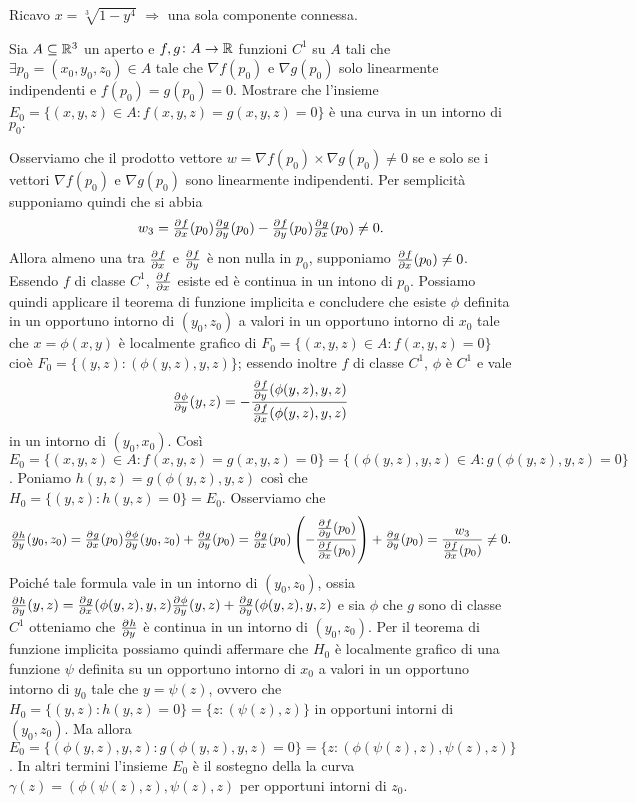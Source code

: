 Ricavo $ x = \sqrt[3]{1 - y^4} $ $ \Rightarrow $ una sola componente connessa.

\begin{es}
  Sia $ A \subseteq \mathbb{R}^3 $ un aperto e $ f, g \colon A \to \mathbb{R} $ funzioni $ C^1 $ su $ A $ tali che $ \exists p_0 = (x_0, y_0, z_0) \in A $ tale che $ \nabla{f(p_0)} $ e $ \nabla{g(p_0)} $ solo linearmente indipendenti e $ f(p_0) = g(p_0) = 0 $. Mostrare che l'insieme $ E_0 = \{(x, y, z) \in A : f(x, y, z) = g(x, y, z) = 0\} $ è una curva in un intorno di $ p_0 .$
\end{es}
%
Osserviamo che il prodotto vettore $ w = \nabla{f(p_0)} \times \nabla{g(p_0)} \neq 0 $ se e solo se i vettori $ \nabla{f(p_0)} $ e $ \nabla{g(p_0)} $ sono linearmente indipendenti. Per semplicità supponiamo quindi che si abbia \[w_3 = \pd{f}{x}(p_0) \pd{g}{y}(p_0) - \pd{f}{y}(p_0)\pd{g}{x}(p_0) \neq 0.\] Allora almeno una tra $ \pd{f}{x} $ e $ \pd{f}{y} $ è non nulla in $ p_0 $, supponiamo $ \pd{f}{x}(p_0) \neq 0 $. Essendo $ f $ di classe $ C^1 $, $ \pd{f}{x} $ esiste ed è continua in un intono di $ p_0 $. Possiamo quindi applicare il teorema di funzione implicita e concludere che esiste $ \phi $ definita in un opportuno intorno di $ (y_0, z_0) $ a valori in un opportuno intorno di $ x_0 $  tale che $ x = \phi(x, y) $ è localmente grafico di $ F_0 = \{(x, y, z) \in A : f(x, y, z) = 0\} $ cioè $ F_0 = \{(y, z) : (\phi(y, z), y, z)\} $; essendo inoltre $ f $ di classe $ C^1 $, $ \phi $ è $ C^1 $ e vale \[\pd{\phi}{y}(y, z) = -\frac{\pd{f}{y}(\phi(y, z), y, z)}{\pd{f}{x}(\phi(y, z), y, z)}\] in un intorno di $ (y_0, x_0) $. Così $ E_0 = \{(x, y, z) \in A : f(x, y, z) = g(x, y, z) = 0\} = \{(\phi(y, z), y, z) \in A : g(\phi(y, z), y, z) = 0\} $. Poniamo $ h(y, z) = g(\phi(y, z), y, z) $ così che $ H_0 = \{(y, z) : h(y, z) = 0\} = E_0 $. Osserviamo che
\begin{equation*}
  \pd{h}{y}(y_0, z_0) = \pd{g}{x}(p_0) \pd{\phi}{y}(y_0, z_0) + \pd{g}{y}(p_0) = \pd{g}{x}(p_0) \left(-\frac{\pd{f}{y}(p_0)}{\pd{f}{x}(p_0)}\right) + \pd{g}{y}(p_0) = \frac{w_3}{\pd{f}{x}(p_0)} \neq 0.
\end{equation*}
Poiché tale formula vale in un intorno di $ (y_0, z_0) $, ossia $ \pd{h}{y}(y, z) = \pd{g}{x}(\phi(y, z), y, z) \pd{\phi}{y}(y, z) + \pd{g}{y}(\phi(y, z), y, z) $ e sia $ \phi $ che $ g $ sono di classe $ C^1 $ otteniamo che $ \pd{h}{y} $ è continua in un intorno di $ (y_0, z_0) $. Per il teorema di funzione implicita possiamo quindi affermare che $ H_0 $ è localmente grafico di una funzione $ \psi $ definita su un opportuno intorno di $ x_0 $ a valori in un opportuno intorno di $ y_0 $ tale che $ y = \psi(z) $, ovvero che $ H_0 = \{(y, z) : h(y, z) = 0\} = \{z : (\psi(z), z)\} $ in opportuni intorni di $ (y_0, z_0) $. Ma allora $ E_0 = \{(\phi(y, z), y, z) : g(\phi(y, z), y, z) = 0\} = \{z : (\phi(\psi(z), z), \psi(z), z)\} $. In altri termini l'insieme $ E_0 $ è il sostegno della la curva $ \gamma(z) = (\phi(\psi(z), z), \psi(z), z) $ per opportuni intorni di $ z_0 $.


